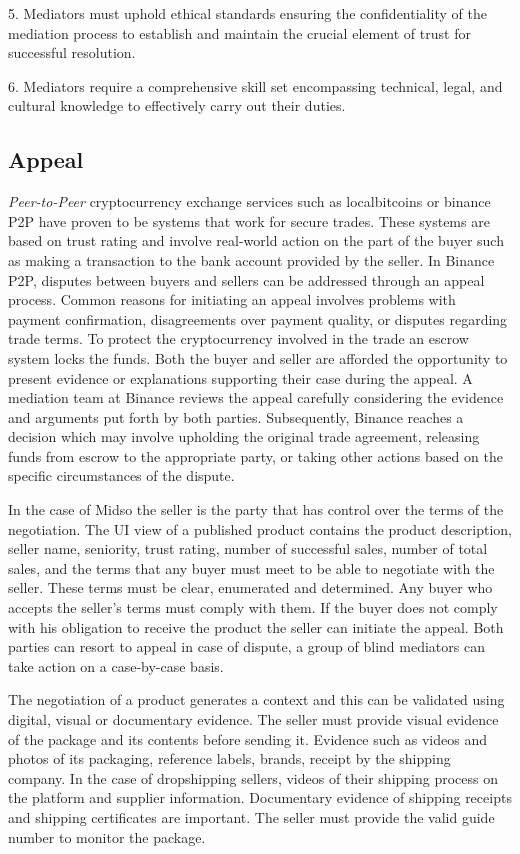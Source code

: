 \documentclass[12pt]{article}
\begin{document}
5. Mediators must uphold ethical standards ensuring the confidentiality of the mediation process to establish and maintain the crucial element of trust for successful resolution.

6. Mediators require a comprehensive skill set encompassing technical, legal, and cultural knowledge to effectively carry out their duties.

\subsection { Appeal } 

\emph{Peer-to-Peer} cryptocurrency exchange services such as localbitcoins or binance P2P have proven to be systems that work for secure trades. These systems are based on trust rating and involve real-world action on the part of the buyer such as making a transaction to the bank account provided by the seller. In Binance P2P, disputes between buyers and sellers can be addressed through an appeal process. Common reasons for initiating an appeal involves problems with payment confirmation, disagreements over payment quality, or disputes regarding trade terms. To protect the cryptocurrency involved in the trade an escrow system locks the funds. Both the buyer and seller are afforded the opportunity to present evidence or explanations supporting their case during the appeal. A mediation team at Binance reviews the appeal carefully considering the evidence and arguments put forth by both parties. Subsequently, Binance reaches a decision which may involve upholding the original trade agreement, releasing funds from escrow to the appropriate party, or taking other actions based on the specific circumstances of the dispute.

In the case of Midso the seller is the party that has control over the terms of the negotiation. The UI view of a published product contains the product description, seller name, seniority, trust rating, number of successful sales, number of total sales, and the terms that any buyer must meet to be able to negotiate with the seller. These terms must be clear, enumerated and determined. Any buyer who accepts the seller's terms must comply with them. If the buyer does not comply with his obligation to receive the product the seller can initiate the appeal. Both parties can resort to appeal in case of dispute, a group of blind mediators can take action on a case-by-case basis.

The negotiation of a product generates a context and this can be validated using digital, visual or documentary evidence. The seller must provide visual evidence of the package and its contents before sending it. Evidence such as videos and photos of its packaging, reference labels, brands, receipt by the shipping company. In the case of dropshipping sellers, videos of their shipping process on the platform and supplier information. Documentary evidence of shipping receipts and shipping certificates are important. The seller must provide the valid guide number to monitor the package.
\end{document}

